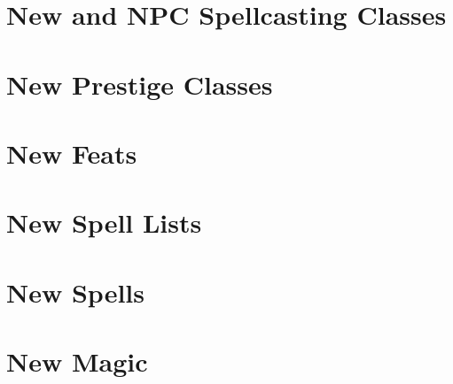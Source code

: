 \section{New and NPC Spellcasting Classes}

 \newpage
\section{New Prestige Classes}
 \newpage
\section{New Feats}
\newpage
\section{New Spell Lists}
\newpage
\section{New Spells}
\newpage
\section{New Magic}
\newpage
